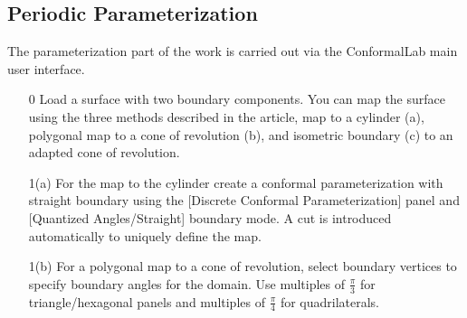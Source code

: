 \documentclass[Thesis.tex]{subfiles}
\begin{document}
\subsection{Periodic Parameterization}
The parameterization part of the work is carried out via the {\sc ConformalLab} main user interface. 

\begin{itemize}
\item[0] Load a surface with two boundary components. You can map the surface using the three methods described in the article, map to a cylinder (a), polygonal map to a cone of revolution (b), and isometric boundary (c) to an adapted cone of revolution.
\item[1(a)] For the map to the cylinder create a conformal parameterization with straight boundary using the [Discrete Conformal Parameterization] panel and [Quantized Angles/Straight] boundary mode. A cut is introduced automatically to uniquely define the map.\\

\begin{center}
\begin{minipage}{0.9\linewidth}
            \centering
            \label{fig:periodic_algorithm1a}
\end{minipage}
\end{center}            

\item[1(b)] For a polygonal map to a cone of revolution, select boundary vertices to specify boundary angles for the domain. Use multiples of $\frac{\pi}{3}$ for triangle/hexagonal panels and multiples of $\frac{\pi}{4}$ for quadrilaterals.


\end{itemize}
\end{document}
